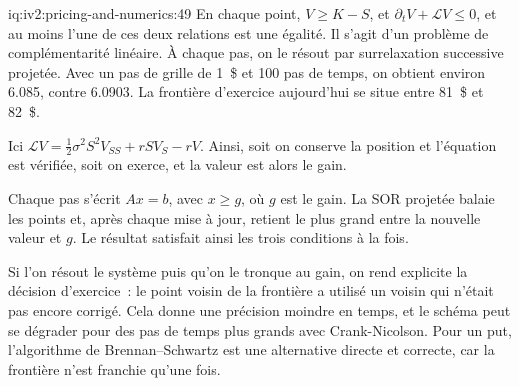 \begin{solution}{iq:iv2:pricing-and-numerics:49}
En chaque point, $V \geq K - S$, et $\partial_tV + \mathcal LV \leq 0$, et au moins l'une de ces deux relations est une égalité. Il s'agit d'un problème de complémentarité linéaire. À chaque pas, on le résout par surrelaxation successive projetée. Avec un pas de grille de 1~\$ et 100 pas de temps, on obtient environ 6.085, contre 6.0903. La frontière d'exercice aujourd'hui se situe entre 81~\$ et 82~\$.

Ici $\mathcal LV = \tfrac12\sigma^2S^2V_{SS} + rSV_S - rV$. Ainsi, soit on conserve la position et l'équation est vérifiée, soit on exerce, et la valeur est alors le gain.

Chaque pas s'écrit $Ax = b$, avec $x \geq g$, où $g$ est le gain. La SOR projetée balaie les points et, après chaque mise à jour, retient le plus grand entre la nouvelle valeur et $g$. Le résultat satisfait ainsi les trois conditions à la fois.

Si l'on résout le système puis qu'on le tronque au gain, on rend explicite la décision d'exercice~: le point voisin de la frontière a utilisé un voisin qui n'était pas encore corrigé. Cela donne une précision moindre en temps, et le schéma peut se dégrader pour des pas de temps plus grands avec Crank-Nicolson. Pour un put, l'algorithme de Brennan--Schwartz est une alternative directe et correcte, car la frontière n'est franchie qu'une fois.

\end{solution}

